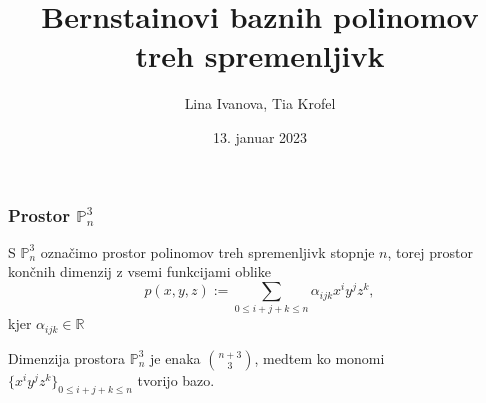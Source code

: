 \documentclass[10pt]{beamer}
\title[Diplomski seminar] %
{Bernstainovi baznih polinomov treh spremenljivk}
\author[Lina Ivanova, Tia Krofel] %
{Lina Ivanova, Tia Krofel
\newline
\newline
\newline 
}
\date[13. januar  2023] %
{13. januar  2023}
\theoremstyle{definition}
\begin{document}
\begin{frame}
  \titlepage
\end{frame}







\begin{frame}

  \frametitle{Prostor $\mathbb{P}^3_n$}
  \begin{block}{}
    S $\mathbb{P}^3_n$ označimo prostor polinomov treh spremenljivk stopnje $n$, 
    torej prostor končnih dimenzij z vsemi funkcijami oblike
    $$ p(x,y,z):=\sum_{0\leq i+j+k\leq n}\alpha_{ijk}x^iy^jz^k,$$ 
    kjer $\alpha_{ijk}\in\mathbb{R}$ \pause
  \end{block}
  \vspace{0.3cm}
  Dimenzija prostora $\mathbb{P}^3_n$ je enaka $\binom{n+3}{3}$, 
  medtem ko monomi $\{x^iy^jz^k\}_{0\leq i+j+k\leq n}$ tvorijo bazo.
\end{frame}
\end{document}
